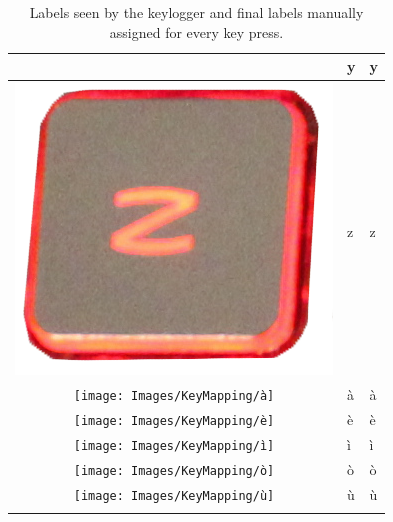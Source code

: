 \begin{longtable}{|cll|}
\begin{minipage}[c]{.3\textwidth}
\vspace{0.2cm}
\end{minipage} & y & y\\
\hline
\begin{minipage}[c]{.3\textwidth}
\vspace{0.2cm}
\includegraphics[scale=0.06]{Images/KeyMapping/z}
\vspace{0.2cm}
\end{minipage} & z & z\\
\hline
\begin{minipage}[c]{.3\textwidth}
\vspace{0.2cm}
\texttt{[image: Images/KeyMapping/à]}
\vspace{0.2cm}
\end{minipage} & à & à\\
\hline
\begin{minipage}[c]{.3\textwidth}
\vspace{0.2cm}
\texttt{[image: Images/KeyMapping/è]}
\vspace{0.2cm}
\end{minipage} & è & è\\
\hline
\begin{minipage}[c]{.3\textwidth}
\vspace{0.2cm}
\texttt{[image: Images/KeyMapping/ì]}
\vspace{0.2cm}
\end{minipage} & ì & ì\\
\hline
\begin{minipage}[c]{.3\textwidth}
\vspace{0.2cm}
\texttt{[image: Images/KeyMapping/ò]}
\vspace{0.2cm}
\end{minipage} & ò & ò\\
\hline
\begin{minipage}[c]{.3\textwidth}
\vspace{0.2cm}
\texttt{[image: Images/KeyMapping/ù]}
\vspace{0.2cm}
\end{minipage} & ù & ù\\
\hline
\caption{Labels seen by the keylogger and final labels manually assigned for every key press.}
\end{longtable}
\normalsize
